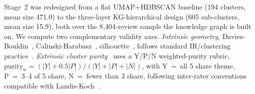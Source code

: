 \documentclass[sigconf, anonymous]{acmart}
\begin{document}
  Stage~2 was redesigned from a flat UMAP+HDBSCAN baseline (194 clusters, mean size 471.0) to the
   three-layer KG-hierarchical design (605 sub-clusters, mean size 15.9), both over the
   8{,}404-review sample the knowledge graph is built on. We compute two
  complementary validity axes. \emph{Intrinsic geometry},
  Davies-Bouldin~\cite{davies1979cluster}, Calinski-Harabasz~\cite{calinski1974dendrite},
  silhouette~\cite{rousseeuw1987silhouettes}, follows standard IR/clustering
  practice~\cite{schutze2008introduction, steinbach2000comparison, strehl2002cluster}.
  \emph{Extrinsic cluster purity}~\cite{amigo2009comparison, schutze2008introduction} uses a
  Y/P/N weighted-purity rubric, $\mathrm{purity}_w = (|Y| + 0.5|P|)/(|Y|+|P|+|N|)$, with Y~=~all
   5 share theme, P~=~3--4 of 5 share, N~=~fewer than 3 share, following inter-rater conventions
   compatible with Landis-Koch~\cite{landis1977measurement}.
\end{document}
